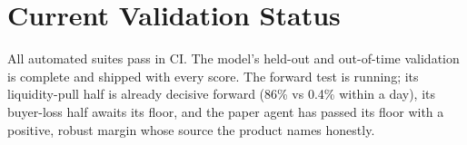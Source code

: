 \section{Current Validation Status}
All automated suites pass in CI. The model's held-out and out-of-time validation is complete and shipped with every score. The forward test is running; its liquidity-pull half is already decisive forward (86\% vs 0.4\% within a day), its buyer-loss half awaits its floor, and the paper agent has passed its floor with a positive, robust margin whose source the product names honestly.
